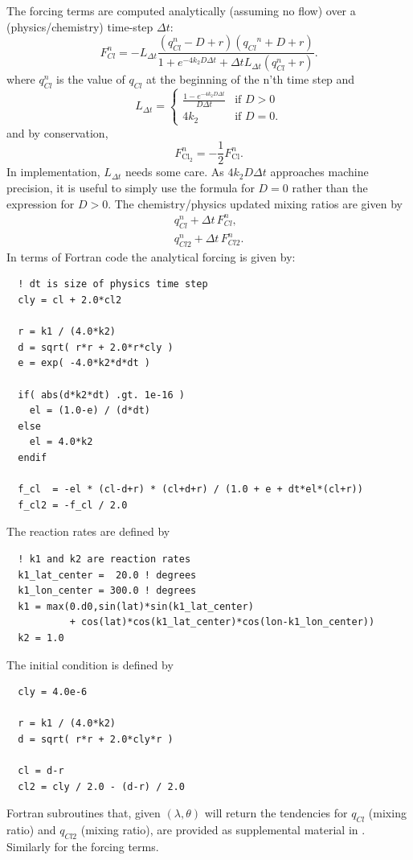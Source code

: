 \documentclass[times,doublespace]{fldauth}
\begin{document}
The forcing terms are computed analytically (assuming no flow) over a (physics/chemistry) time-step $\Delta t$:
\begin{equation}
F_{Cl}^n= - L_{\Delta t} \frac{ (q_{Cl}^n - D + r ) (  {q_{Cl}}^n  + D + r  ) }{ 1+e^{-4 k_2 D \Delta t} + \Delta t L_{\Delta t} (q_{Cl}^n + r )  }.
\end{equation}
where $q_{Cl}^n$ is the value of $q_{Cl}$ at the beginning of the n'th time step and
\begin{equation}
  L_{\Delta t} = 
  \left\{ 
     \begin{array}{cc}  
          \frac{1-e^{-4 k_2 D \Delta t}}{D \Delta t}  &\mbox{if }  D > 0 \\[1ex]
          4k_2 &\mbox{if } D = 0.
      \end{array} 
   \right. \label{eq:linvsexp}
\end{equation}
and by conservation,
\begin{equation}
F_{\mathrm{Cl}_2  }^n = -\frac{1}{2} F_{\mathrm{Cl}  }^n .
\end{equation}
In implementation, $L_{\Delta t} $ needs some care.  As $4 k_2 D \Delta t$ approaches machine precision, it is useful to simply use the formula for $D=0$ rather than the expression for $D>0$. The chemistry/physics updated mixing ratios are given by
\begin{eqnarray}
q^n_{Cl}+\Delta t\, F_{Cl}^n,\\
q^n_{Cl2}+\Delta t\, F_{Cl2}^n.
\end{eqnarray}
In terms of Fortran code the analytical forcing is given by:
\begin{verbatim}
  ! dt is size of physics time step
  cly = cl + 2.0*cl2

  r = k1 / (4.0*k2)
  d = sqrt( r*r + 2.0*r*cly )
  e = exp( -4.0*k2*d*dt )

  if( abs(d*k2*dt) .gt. 1e-16 )
    el = (1.0-e) / (d*dt)
  else
    el = 4.0*k2
  endif

  f_cl  = -el * (cl-d+r) * (cl+d+r) / (1.0 + e + dt*el*(cl+r))
  f_cl2 = -f_cl / 2.0
\end{verbatim}
The reaction rates are defined by
\begin{verbatim}
  ! k1 and k2 are reaction rates
  k1_lat_center =  20.0 ! degrees
  k1_lon_center = 300.0 ! degrees
  k1 = max(0.d0,sin(lat)*sin(k1_lat_center) 
           + cos(lat)*cos(k1_lat_center)*cos(lon-k1_lon_center))
  k2 = 1.0
\end{verbatim}
The initial condition is defined by
\begin{verbatim}
  cly = 4.0e-6

  r = k1 / (4.0*k2)
  d = sqrt( r*r + 2.0*cly*r )

  cl = d-r
  cl2 = cly / 2.0 - (d-r) / 2.0
\end{verbatim}
Fortran subroutines that, given $(\lambda,\theta)$ will return the tendencies for $q_{Cl}$ (mixing ratio) and $q_{Cl2}$ (mixing ratio), are provided as supplemental material in \cite{LCLVT2015GMD}. Similarly for the forcing terms.
\end{document}
